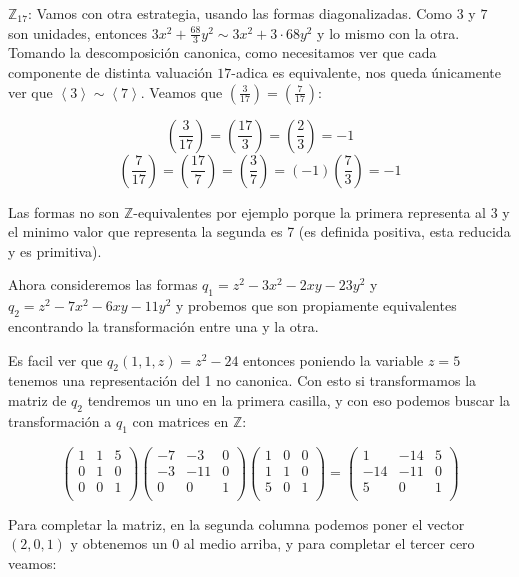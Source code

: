 \documentclass[12pt]{amsart}
\newcommand{\ZZ}{\mathbb{Z}}
\newcommand{\leg}[2]{\left( \frac{#1}{#2} \right)}
\newcommand{\lp}{\left(}
\newcommand{\rp}{\right)}
\newcommand{\lc}{\left<}
\newcommand{\rc}{\right>}
\theoremstyle{plain}
\begin{document}
$\ZZ_{17}$: Vamos con otra estrategia, usando las formas 
diagonalizadas. Como $3$ y $7$ son unidades, entonces 
$3x^2+\frac{68}{3}y^2\sim 3x^2+3\cdot68y^2$ y lo mismo con
la otra. Tomando la descomposición canonica, como
necesitamos ver que cada componente de distinta valuación 
$17$-adica es equivalente, nos queda únicamente ver que 
$\lc3\rc \sim\lc7\rc$. Veamos que $\leg{3}{17}=\leg{7}{17}$:

$$\leg{3}{17} = \leg{17}{3} = \leg{2}{3} =-1$$
$$\leg{7}{17} = \leg{17}{7} = \leg{3}{7} = (-1)\leg{7}{3} 
= -1$$

Las formas no son $\ZZ$-equivalentes por ejemplo porque la 
primera representa al 3 y el minimo valor que representa la 
segunda es 7 (es definida positiva, esta reducida y es 
primitiva).

Ahora consideremos las formas $q_1=z^2-3x^2-2xy-23y^2$ y 
$q_2=z^2-7x^2-6xy-11y^2$ y probemos que son propiamente 
equivalentes encontrando la transformación entre una y la 
otra.

Es facil ver que $q_2(1,1,z)=z^2-24$ entonces poniendo la 
variable $z=5$ tenemos una representación del 1 no canonica.
Con esto si transformamos la matriz de $q_2$ tendremos un 
uno en la primera casilla, y con eso podemos buscar la 
transformación a $q_1$ con matrices en $\ZZ$:

$$\lp\begin{matrix}
    1&1&5 \\
    0&1&0 \\
    0&0&1 \\
\end{matrix}\rp
\lp\begin{matrix}
    -7&-3&0 \\
    -3&-11&0 \\
    0&0&1 \\
\end{matrix}\rp
\lp\begin{matrix}
    1&0&0 \\
    1&1&0 \\
    5&0&1 \\
\end{matrix}\rp = 
\lp\begin{matrix}
    1&-14&5 \\
    -14&-11&0 \\
    5&0&1 \\
\end{matrix}\rp$$

Para completar la matriz, en la segunda columna podemos 
poner el vector $(2,0,1)$ y obtenemos un 0 al medio arriba, 
y para completar el tercer cero veamos:
\end{document}

